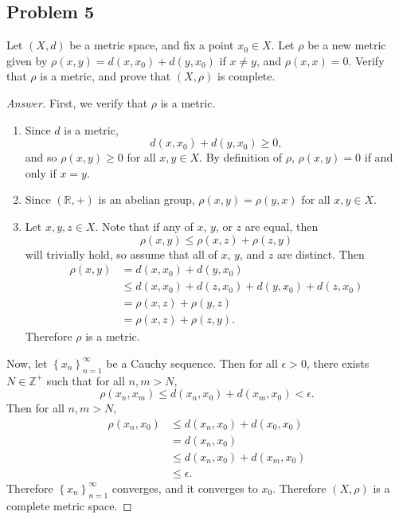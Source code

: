 \documentclass[12pt]{article}
\newcommand{\z}{\mathbb{Z}}
\newcommand{\real}{\mathbb{R}}
\newcommand\paren[1]{\left( #1 \right)}
\newcommand\setb[1]{\left \{ #1 \right \}}
\theoremstyle{definition}
\begin{document}
\subsection{Problem 5}
Let $(X,d)$ be a metric space, and fix a point $x_0 \in X$. Let $\rho$ be a new metric given by $\rho(x,y) = d \paren{ x , x_0 } + d \paren{ y , x_0 }$ if $x \neq y$, and $\rho(x,x) = 0$. Verify that $\rho$ is a metric, and prove that $(X,\rho)$ is complete.
\begin{proof}[Answer]
    First, we verify that $\rho$ is a metric.
    \begin{enumerate}
        \item Since $d$ is a metric,
        \[
            d \paren{ x, x_0 } + d \paren{ y , x_0 } \geq 0,
        \]
        and so $\rho(x,y) \geq 0$ for all $x , y \in X$. By definition of $\rho$, $\rho(x,y) = 0$ if and only if $x = y$.
        \item Since $(\real,+)$ is an abelian group, $\rho(x,y) = \rho(y,x)$ for all $x,y \in X$.
        \item Let $x , y , z \in X$. Note that if any of $x$, $y$, or $z$ are equal, then 
        \[
            \rho(x,y) \leq \rho(x,z) + \rho(z,y)
        \]
        will trivially hold, so assume that all of $x$, $y$, and $z$ are distinct. Then 
        \begin{align*}
            \rho(x,y) & = d \paren{ x , x_0 } + d \paren{ y , x_0 } \\
            & \leq d \paren{ x , x_0 } + d \paren{ z , x_0 } +  d \paren{ y , x_0 } + d \paren{ z , x_0 } \\
            & = \rho(x,z) + \rho(y,z) \\
            & = \rho(x,z) + \rho(z,y).
        \end{align*}
        Therefore $\rho$ is a metric.
    \end{enumerate}
    Now, let $\setb{ x_n }_{n = 1}^{\infty}$ be a Cauchy sequence. Then for all $\epsilon > 0$, there exists $N \in \z^+$ such that for all $n , m > N$, 
    \[
        \rho \paren{ x_n , x_m } \leq d \paren{ x_n , x_0 } + d \paren{ x_m , x_0 } < \epsilon.
    \]
    Then for all $n , m > N$, 
    \begin{align*}
        \rho \paren{ x_n , x_0 } & \leq d \paren{ x_n , x_0 } + d \paren{ x_0 , x_0 } \\
        & = d \paren{ x_n , x_0 } \\
        & \leq d \paren{ x_n , x_0 } + d \paren{ x_m , x_0 } \\
        & \leq \epsilon.
    \end{align*}
    Therefore $\setb{ x_n }_{n = 1}^{\infty}$ converges, and it converges to $x_0$. Therefore $(X,\rho)$ is a complete metric space.
\end{proof}
\end{document}
